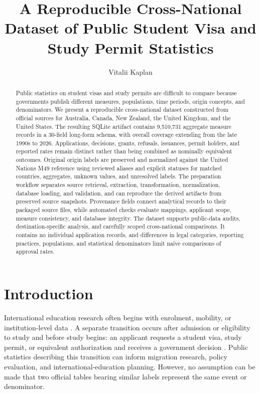 \documentclass[runningheads]{llncs}
\title{A Reproducible Cross-National Dataset of Public Student Visa and Study Permit Statistics}
\author{Vitalii Kaplan\orcidID{0009-0009-8181-2863}}
\institute{\email{2333275007@alu.istinye.edu.tr}}
\begin{document}
\raggedbottom
\maketitle

\begin{abstract}
Public statistics on student visas and study permits are difficult to compare because governments publish different measures, populations, time periods, origin concepts, and denominators. We present a reproducible cross-national dataset constructed from official sources for Australia, Canada, New Zealand, the United Kingdom, and the United States. The resulting SQLite artifact contains 9,510,731 aggregate measure records in a 30-field long-form schema, with overall coverage extending from the late 1990s to 2026. Applications, decisions, grants, refusals, issuances, permit holders, and reported rates remain distinct rather than being combined as nominally equivalent outcomes. Original origin labels are preserved and normalized against the United Nations M49 reference using reviewed aliases and explicit statuses for matched countries, aggregates, unknown values, and unresolved labels. The preparation workflow separates source retrieval, extraction, transformation, normalization, database loading, and validation, and can reproduce the derived artifacts from preserved source snapshots. Provenance fields connect analytical records to their packaged source files, while automated checks evaluate mappings, applicant scope, measure consistency, and database integrity. The dataset supports public-data audits, destination-specific analysis, and carefully scoped cross-national comparisons. It contains no individual application records, and differences in legal categories, reporting practices, populations, and statistical denominators limit na\"ive comparisons of approval rates.
\end{abstract}

\section{Introduction}

International education research often begins with enrolment, mobility, or institution-level data \cite{abbott2016,huang2023,weber2023,bartha2018}. A separate transition occurs after admission or eligibility to study and before study begins: an applicant requests a student visa, study permit, or equivalent authorization and receives a government decision \cite{chen2023,gonnot2025}. Public statistics describing this transition can inform migration research, policy evaluation, and international-education planning. However, no assumption can be made that two official tables bearing similar labels represent the same event or denominator.
\end{document}
